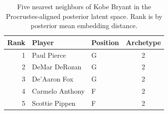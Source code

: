 \begin{table}[htbp]
  \centering\small
  \begin{tabular}{rllc}
    \toprule
    Rank & Player & Position & Archetype \\
    \midrule
    1 & Paul Pierce & G & 2 \\
    2 & DeMar DeRozan & G & 2 \\
    3 & De'Aaron Fox & G & 2 \\
    4 & Carmelo Anthony & F & 2 \\
    5 & Scottie Pippen & F & 2 \\
    \bottomrule
  \end{tabular}
  \caption{Five nearest neighbors of Kobe Bryant in the Procrustes-aligned posterior latent space. Rank is by posterior mean embedding distance.}
  \label{tab:Kobe_Bryant_neighbors}
\end{table}


